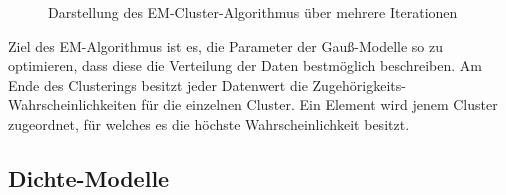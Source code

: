 \begin{figure}[H]
    \centering
    \caption[Darstellung des EM-Cluster-Algorithmus über mehrere Iterationen]{Darstellung des EM-Cluster-Algorithmus über mehrere Iterationen \cite[]{GeorgeSeif2018}}
    \label{fig:grund_em_clustering}
\end{figure}

Ziel des EM-Algorithmus ist es, die Parameter der Gauß-Modelle so zu optimieren, dass diese die Verteilung der Daten bestmöglich beschreiben.
Am Ende des Clusterings besitzt jeder Datenwert die Zugehörigkeits-Wahrscheinlichkeiten für die einzelnen Cluster.
Ein Element wird jenem Cluster zugeordnet, für welches es die höchste Wahrscheinlichkeit besitzt.

\subsection{Dichte-Modelle}
\label{sec:grund_density_clustering}

